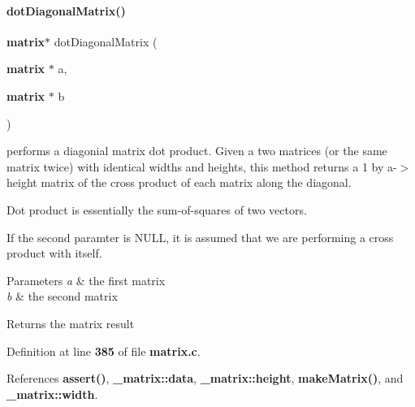 \paragraph{dot\+Diagonal\+Matrix()}
{\footnotesize\ttfamily \textbf{ matrix}$\ast$ dot\+Diagonal\+Matrix (\begin{DoxyParamCaption}\item[{\textbf{ matrix} $\ast$}]{a,  }\item[{\textbf{ matrix} $\ast$}]{b }\end{DoxyParamCaption})}



performs a diagonial matrix dot product. Given a two matrices (or the same matrix twice) with identical widths and heights, this method returns a 1 by a-\/$>$height matrix of the cross product of each matrix along the diagonal. 

Dot product is essentially the sum-\/of-\/squares of two vectors.

If the second paramter is N\+U\+LL, it is assumed that we are performing a cross product with itself. 
\begin{DoxyParams}{Parameters}
{\em a} & the first matrix \\
\hline
{\em b} & the second matrix \\
\hline
\end{DoxyParams}
\begin{DoxyReturn}{Returns}
the matrix result 
\end{DoxyReturn}


Definition at line \textbf{ 385} of file \textbf{ matrix.\+c}.



References \textbf{ assert()}, \textbf{ \+\_\+matrix\+::data}, \textbf{ \+\_\+matrix\+::height}, \textbf{ make\+Matrix()}, and \textbf{ \+\_\+matrix\+::width}.


